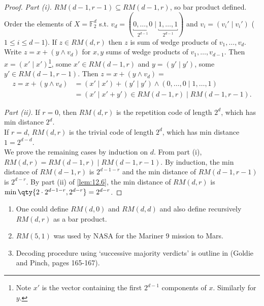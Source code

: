 \begin{proof}
    \emph{Part (i).}
    $RM(d-1, r-1) \subseteq RM(d-1, r)$, so bar product defined.
    Order the elements of $X = \mathbb{F}_2^d$ s.t. $v_d = (\underbracket{0, \dots, 0}_{2^{d-1}} \mid \underbracket{1, \dots, 1}_{2^{d-1}})$ and $v_i = (v_i' \mid v_i')$ ($1 \leq i \leq d - 1$).
    If $z \in RM(d, r)$ then $z$ is sum of wedge products of $v_1, \dots, v_d$.
    Write $z = x + (y \wedge v_d)$ for $x, y$ sums of wedge products of $v_1, \dots, v_{d-1}$.
    Then $x = (x' \mid x')$\footnote{Note $x'$ is the vector containing the first $2^{d-1}$ components of $x$. Similarly for $y$.}, some $x' \in RM(d-1, r)$ and $y = (y' \mid y')$, some $y' \in RM(d-1, r-1)$.
    Then $z = x + (y \wedge v_d) = $
    \begin{align*}
        z = x + (y \wedge v_d) &= (x' \mid x') + (y' \mid y') \wedge (0, \dots, 0 \mid 1, \dots, 1) \\
        &= (x' \mid x' + y') \in RM(d-1, r) \mid RM(d-1, r-1).
    \end{align*}

    \emph{Part (ii).}
    If $r = 0$, then $RM(d,r)$ is the repetition code of length $2^d$, which has min distance $2^d$. \\
    If $r = d$, $RM(d,r)$ is the trivial code of length $2^d$, which has min distance $1 = 2^{d-d}$. \\
    We prove the remaining cases by induction on $d$.
    From part (i), $RM(d,r) = RM(d-1,r) \mid RM(d-1,r-1)$.
    By induction, the min distance of $RM(d-1,r)$ is $2^{d-1-r}$ and the min distance of $RM(d-1,r-1)$ is $2^{d-r}$.
    By part (ii) of \cref{lem:12.6}, the min distance of $RM(d,r)$ is $\min\qty{2\cdot 2^{d-1-r}, 2^{d-r}} = 2^{d-r}$.
\end{proof}

\begin{remark}
    \begin{enumerate}
        \item One could define $RM(d, 0)$ and $RM(d, d)$ and also define recursively $RM(d, r)$ as a bar product.
        \item $RM(5, 1)$ was used by NASA for the Mariner 9 mission to Mars.
        \item Decoding procedure using `successive majority verdicts' is outline in (Goldie and Pinch, pages 165-167).
    \end{enumerate}
\end{remark}

